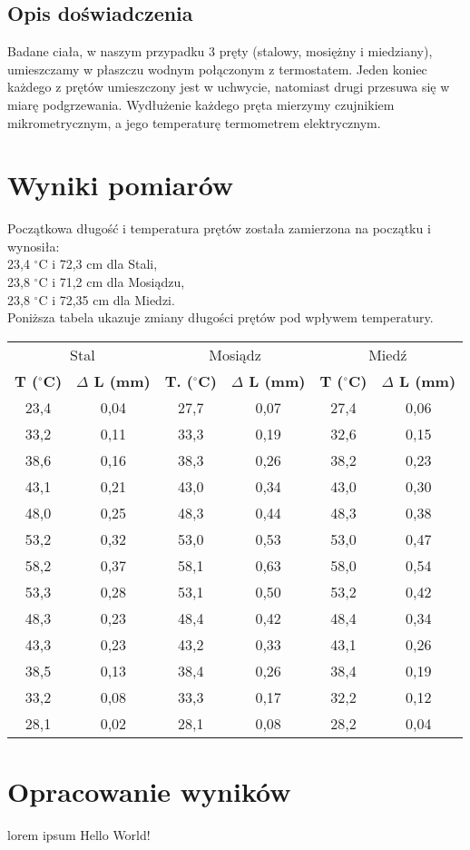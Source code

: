 \documentclass[10pt,a4paper]{article}
\newcommand{\forceindent}{\leavevmode{\parindent=3em\indent}}
\begin{document}
\subsection*{Opis doświadczenia}

\forceindent Badane ciała, w naszym przypadku 3 pręty (stalowy, mosiężny i miedziany), umieszczamy w płaszczu wodnym połączonym z termostatem. Jeden koniec każdego z prętów umieszczony jest w uchwycie, natomiast drugi przesuwa się w miarę podgrzewania. Wydłużenie każdego pręta mierzymy czujnikiem mikrometrycznym, a jego temperaturę termometrem elektrycznym.  

\section{Wyniki pomiarów}
Początkowa długość i temperatura prętów została zamierzona na początku i wynosiła:\\
23,4 $^{\circ}$C i 72,3 cm dla Stali,\\
23,8 $^{\circ}$C i 71,2 cm dla Mosiądzu,\\
23,8 $^{\circ}$C i 72,35 cm dla Miedzi.\\

\newpage
\forceindent Poniższa tabela ukazuje zmiany długości prętów pod wpływem temperatury.\\

\begin{center}
\begin{tabular}{|c|c||c|c||c|c|}
\multicolumn{2}{c}{Stal} & \multicolumn{2}{c}{Mosiądz} & \multicolumn{2}{c}{Miedź}\\
\hhline{|=|==|==|=|}
\textbf{T ($^{\circ}$C)} & \textbf{$\Delta$ L (mm)} & \textbf{T. ($^{\circ}$C)} & \textbf{$\Delta$ L (mm)} & \textbf{T ($^{\circ}$C)} & \textbf{$\Delta$ L (mm)}\\
\hline
23,4 & 0,04 & 27,7 & 0,07 & 27,4 & 0,06\\
\hline
33,2 & 0,11 & 33,3 & 0,19 & 32,6 & 0,15\\
\hline
38,6 & 0,16 & 38,3 & 0,26 & 38,2 & 0,23\\
\hline
43,1 & 0,21 & 43,0 & 0,34 & 43,0 & 0,30\\
\hline
48,0 & 0,25 & 48,3 & 0,44 & 48,3 & 0,38\\
\hline
53,2 & 0,32 & 53,0 & 0,53 & 53,0 & 0,47\\
\hline
58,2 & 0,37 & 58,1 & 0,63 & 58,0 & 0,54\\
\hline
53,3 & 0,28 & 53,1 & 0,50 & 53,2 & 0,42\\
\hline
48,3 & 0,23 & 48,4 & 0,42 & 48,4 & 0,34\\
\hline
43,3 & 0,23 & 43,2 & 0,33 & 43,1 & 0,26\\
\hline
38,5 & 0,13 & 38,4 & 0,26 & 38,4 & 0,19\\
\hline
33,2 & 0,08 & 33,3 & 0,17 & 32,2 & 0,12\\
\hline
28,1 & 0,02 & 28,1 & 0,08 & 28,2 & 0,04\\
\hline

\end{tabular}
\end{center}

\section{Opracowanie wyników}
lorem ipsum
Hello World!
\end{document}
